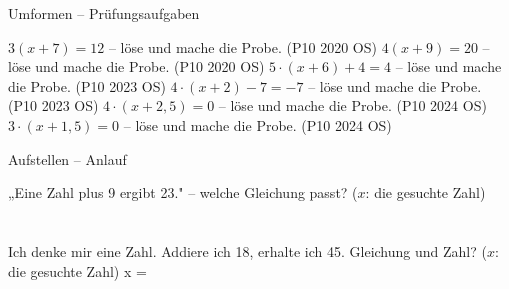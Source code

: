 \begin{aufgabe}{Umformen – Prüfungsaufgaben}
\begin{teile}
\teil $3(x + 7) = 12$ – löse und mache die Probe. \hfill (P10 2020 OS)
\teil $4(x + 9) = 20$ – löse und mache die Probe. \hfill (P10 2020 OS)
\teil $5 \cdot (x + 6) + 4 = 4$ – löse und mache die Probe. \hfill (P10 2023 OS)
\teil $4 \cdot (x + 2) - 7 = -7$ – löse und mache die Probe. \hfill (P10 2023 OS)
\teil $4 \cdot (x + 2{,}5) = 0$ – löse und mache die Probe. \hfill (P10 2024 OS)
\teil $3 \cdot (x + 1{,}5) = 0$ – löse und mache die Probe. \hfill (P10 2024 OS)
\end{teile}
\end{aufgabe}

\begin{aufgabe}{Aufstellen – Anlauf}
\begin{teile}
\teil „Eine Zahl plus 9 ergibt 23." – welche Gleichung passt? ($x$: die gesuchte Zahl) \\  \\  \\ 
\teil Ich denke mir eine Zahl. Addiere ich 18, erhalte ich 45. Gleichung und Zahl? ($x$: die gesuchte Zahl) x = \leerfeld
\end{teile}
\end{aufgabe}

